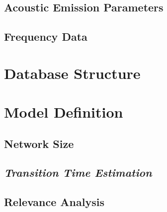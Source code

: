 \subsection{Acoustic Emission Parameters}
\subsection{Frequency Data}

\section{Database Structure}

\section{Model Definition}

\subsection{Network Size}
\subsection{\textit{Transition Time Estimation}}
\subsection{Relevance Analysis}

